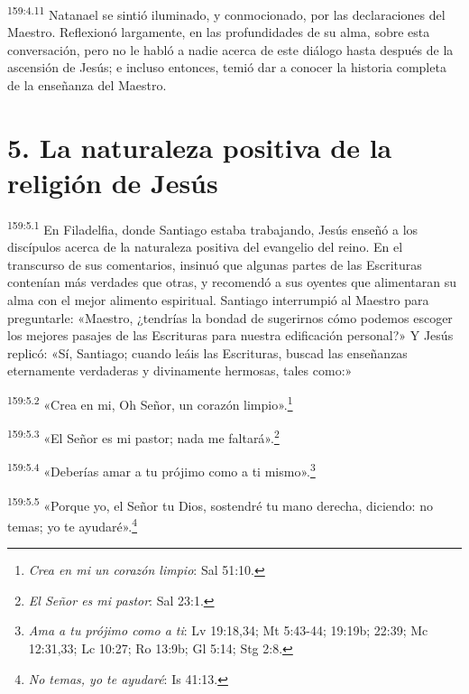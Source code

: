 \par 
\textsuperscript{159:4.11} Natanael se sintió iluminado, y conmocionado, por las declaraciones del Maestro. Reflexionó largamente, en las profundidades de su alma, sobre esta conversación, pero no le habló a nadie acerca de este diálogo hasta después de la ascensión de Jesús; e incluso entonces, temió dar a conocer la historia completa de la enseñanza del Maestro.

\section*{5. La naturaleza positiva de la religión de Jesús}
\par 
\textsuperscript{159:5.1} En Filadelfia, donde Santiago estaba trabajando, Jesús enseñó a los discípulos acerca de la naturaleza positiva del evangelio del reino. En el transcurso de sus comentarios, insinuó que algunas partes de las Escrituras contenían más verdades que otras, y recomendó a sus oyentes que alimentaran su alma con el mejor alimento espiritual. Santiago interrumpió al Maestro para preguntarle: «Maestro, ¿tendrías la bondad de sugerirnos cómo podemos escoger los mejores pasajes de las Escrituras para nuestra edificación personal?» Y Jesús replicó: «Sí, Santiago; cuando leáis las Escrituras, buscad las enseñanzas eternamente verdaderas y divinamente hermosas, tales como:»

\par 
\textsuperscript{159:5.2} «Crea en mi, Oh Señor, un corazón limpio».\footnote{\textit{Crea en mi un corazón limpio}: Sal 51:10.}

\par 
\textsuperscript{159:5.3} «El Señor es mi pastor; nada me faltará».\footnote{\textit{El Señor es mi pastor}: Sal 23:1.}

\par 
\textsuperscript{159:5.4} «Deberías amar a tu prójimo como a ti mismo».\footnote{\textit{Ama a tu prójimo como a ti}: Lv 19:18,34; Mt 5:43-44; 19:19b; 22:39; Mc 12:31,33; Lc 10:27; Ro 13:9b; Gl 5:14; Stg 2:8.}

\par 
\textsuperscript{159:5.5} «Porque yo, el Señor tu Dios, sostendré tu mano derecha, diciendo: no temas; yo te ayudaré».\footnote{\textit{No temas, yo te ayudaré}: Is 41:13.}

